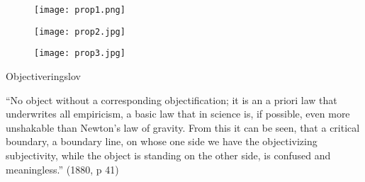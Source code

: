 \documentclass[ignorenonframetext, ]{beamer}
\begin{document}
\begin{frame}

  \begin{figure}[!ht]
    \captionsetup[subfigure]{skip=0.5ex,
                             belowskip=1ex,
                             labelformat=simple}
    \renewcommand\thesubfigure{}

\hfill
{}
\hfill
{}

\medskip
{}
\hfill
{}
\hfill
{}
    \end{figure}

  
\end{frame}

\begin{frame}

\begin{figure}
  \centering \texttt{[image: prop1.png]}
\end{figure}
\end{frame}

\begin{frame}

\begin{figure}
\centering
\texttt{[image: prop2.jpg]}
\end{figure}
\end{frame}

\begin{frame}

\begin{figure}
\centering
\texttt{[image: prop3.jpg]}

\end{figure}
\end{frame}



\begin{frame}{Objectiveringslov}

  ``No object without a corresponding objectification; it is an a
  priori law that underwrites all empiricism, a basic law that in
  science is, if possible, even more unshakable than Newton's law of
  gravity. From this it can be seen, that a critical boundary, a
  boundary line, on whose one side we have the objectivizing
  subjectivity, while the object is standing on the other side, is
  confused and meaningless.'' (1880, p 41)

\end{frame}
\end{document}
